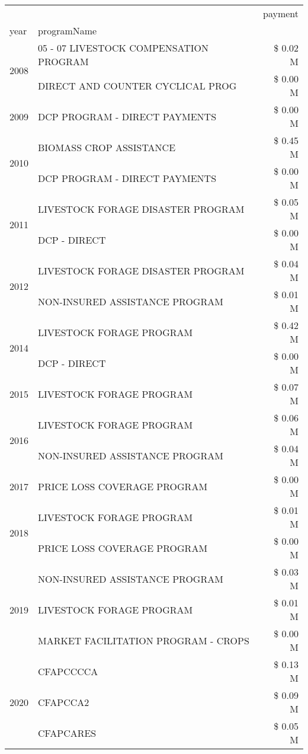 \begin{tabular}{llr}
\toprule
 &  & payment \\
year & programName &  \\
\midrule
\multirow[t]{2}{*}{2008} & 05 - 07 LIVESTOCK COMPENSATION PROGRAM & \$ 0.02 M \\
 & DIRECT AND COUNTER CYCLICAL PROG & \$ 0.00 M \\
\cline{1-3}
2009 & DCP PROGRAM - DIRECT PAYMENTS & \$ 0.00 M \\
\cline{1-3}
\multirow[t]{2}{*}{2010} & BIOMASS CROP ASSISTANCE & \$ 0.45 M \\
 & DCP PROGRAM - DIRECT PAYMENTS & \$ 0.00 M \\
\cline{1-3}
\multirow[t]{2}{*}{2011} & LIVESTOCK FORAGE DISASTER PROGRAM & \$ 0.05 M \\
 & DCP - DIRECT & \$ 0.00 M \\
\cline{1-3}
\multirow[t]{2}{*}{2012} & LIVESTOCK FORAGE DISASTER PROGRAM & \$ 0.04 M \\
 & NON-INSURED ASSISTANCE PROGRAM & \$ 0.01 M \\
\cline{1-3}
\multirow[t]{2}{*}{2014} & LIVESTOCK FORAGE PROGRAM & \$ 0.42 M \\
 & DCP - DIRECT & \$ 0.00 M \\
\cline{1-3}
2015 & LIVESTOCK FORAGE PROGRAM & \$ 0.07 M \\
\cline{1-3}
\multirow[t]{2}{*}{2016} & LIVESTOCK FORAGE PROGRAM                      & \$ 0.06 M \\
 & NON-INSURED ASSISTANCE PROGRAM                & \$ 0.04 M \\
\cline{1-3}
2017 & PRICE LOSS COVERAGE PROGRAM & \$ 0.00 M \\
\cline{1-3}
\multirow[t]{2}{*}{2018} & LIVESTOCK FORAGE PROGRAM & \$ 0.01 M \\
 & PRICE LOSS COVERAGE PROGRAM & \$ 0.00 M \\
\cline{1-3}
\multirow[t]{3}{*}{2019} & NON-INSURED ASSISTANCE PROGRAM & \$ 0.03 M \\
 & LIVESTOCK FORAGE PROGRAM & \$ 0.01 M \\
 & MARKET FACILITATION PROGRAM - CROPS & \$ 0.00 M \\
\cline{1-3}
\multirow[t]{3}{*}{2020} & CFAPCCCCA & \$ 0.13 M \\
 & CFAPCCA2 & \$ 0.09 M \\
 & CFAPCARES & \$ 0.05 M \\
\cline{1-3}
\bottomrule
\end{tabular}
